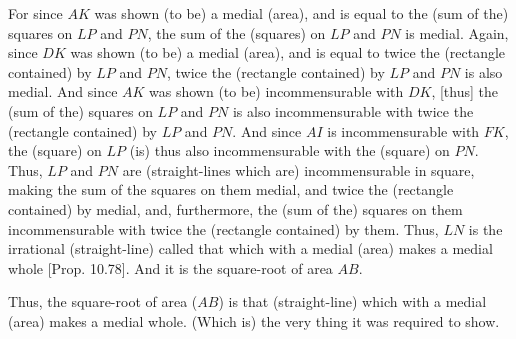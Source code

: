 \begin{Parallel}{}{}
{For since $AK$ was shown (to be) a medial (area), and is equal to the
(sum of the) squares on $LP$ and $PN$, the sum of the (squares) on
$LP$ and $PN$ is medial. Again, since $DK$ was shown (to
be) a medial (area), and is equal to twice the (rectangle contained)
by $LP$ and $PN$, twice the (rectangle contained) by $LP$ and
$PN$ is also medial. And since $AK$ was shown (to be) incommensurable
with $DK$, [thus] the (sum of the) squares on $LP$ and $PN$ is also
incommensurable with twice the (rectangle contained) by $LP$ and $PN$.
And since $AI$ is incommensurable with $FK$, the (square) on
$LP$ (is) thus also incommensurable with the (square) on $PN$. Thus, $LP$ and $PN$
are (straight-lines which are) incommensurable in square, making the sum of the squares on them
medial, and twice the (rectangle contained) by  medial, and, furthermore,
the (sum of the) squares on them incommensurable with twice the
(rectangle contained) by them. Thus, $LN$ is the irrational (straight-line) called  that  which with a medial (area) makes a medial whole [Prop. 10.78]. And it is the square-root of area $AB$.

Thus, the square-root of area ($AB$) is that (straight-line) which with a medial (area) makes a medial whole. (Which is) the very thing it was required to show.}
\end{Parallel}

